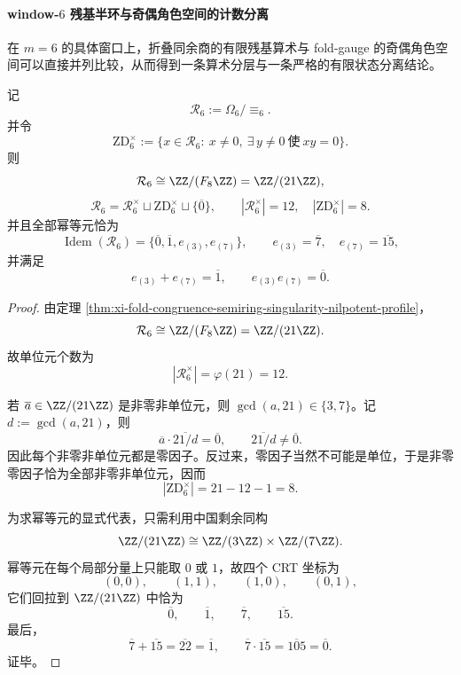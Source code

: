 \paragraph{window-\texorpdfstring{$6$}{6} 残基半环与奇偶角色空间的计数分离}
在 \(m=6\) 的具体窗口上，折叠同余商的有限残基算术与 fold-gauge 的奇偶角色空间可以直接并列比较，从而得到一条算术分层与一条严格的有限状态分离结论。

\begin{theorem}\label{thm:xi-window6-residue-semiring-unit-zerodivisor-idempotent-trichotomy}
记
\[
\mathcal R_6:=\Omega_6/\!\equiv_6.
\]
并令
\[
\mathrm{ZD}_6^\times
:=
\{x\in \mathcal R_6:\ x\neq 0,\ \exists\,y\neq 0\ \text{使}\ xy=0\}.
\]
则
\[
\mathcal R_6\cong \ZZ/(F_8\ZZ)=\ZZ/(21\ZZ),
\]
\[
\mathcal R_6
=
\mathcal R_6^\times\sqcup \mathrm{ZD}_6^\times\sqcup \{\overline 0\},
\qquad
|\mathcal R_6^\times|=12,\quad
|\mathrm{ZD}_6^\times|=8.
\]
并且全部幂等元恰为
\[
\operatorname{Idem}(\mathcal R_6)=\{\overline 0,\overline 1,e_{(3)},e_{(7)}\},
\qquad
e_{(3)}=\overline 7,\quad e_{(7)}=\overline{15},
\]
并满足
\[
e_{(3)}+e_{(7)}=\overline 1,
\qquad
e_{(3)}e_{(7)}=\overline 0.
\]
\end{theorem}
\begin{proof}
由定理 \ref{thm:xi-fold-congruence-semiring-singularity-nilpotent-profile}，
\[
\mathcal R_6\cong \ZZ/(F_8\ZZ)=\ZZ/(21\ZZ).
\]
故单位元个数为
\[
|\mathcal R_6^\times|=\varphi(21)=12.
\]

若 \(\overline a\in \ZZ/(21\ZZ)\) 是非零非单位元，则 \(\gcd(a,21)\in\{3,7\}\)。记 \(d:=\gcd(a,21)\)，则
\[
\overline a\cdot \overline{21/d}=\overline 0,
\qquad
\overline{21/d}\neq \overline 0.
\]
因此每个非零非单位元都是零因子。反过来，零因子当然不可能是单位，于是非零零因子恰为全部非零非单位元，因而
\[
|\mathrm{ZD}_6^\times|=21-12-1=8.
\]

为求幂等元的显式代表，只需利用中国剩余同构
\[
\ZZ/(21\ZZ)\cong \ZZ/(3\ZZ)\times \ZZ/(7\ZZ).
\]
幂等元在每个局部分量上只能取 \(0\) 或 \(1\)，故四个 CRT 坐标为
\[
(0,0),\qquad (1,1),\qquad (1,0),\qquad (0,1),
\]
它们回拉到 \(\ZZ/(21\ZZ)\) 中恰为
\[
\overline 0,\qquad \overline 1,\qquad \overline 7,\qquad \overline{15}.
\]
最后，
\[
\overline 7+\overline{15}=\overline{22}=\overline 1,
\qquad
\overline 7\cdot \overline{15}=\overline{105}=\overline 0.
\]
证毕。
\end{proof}


